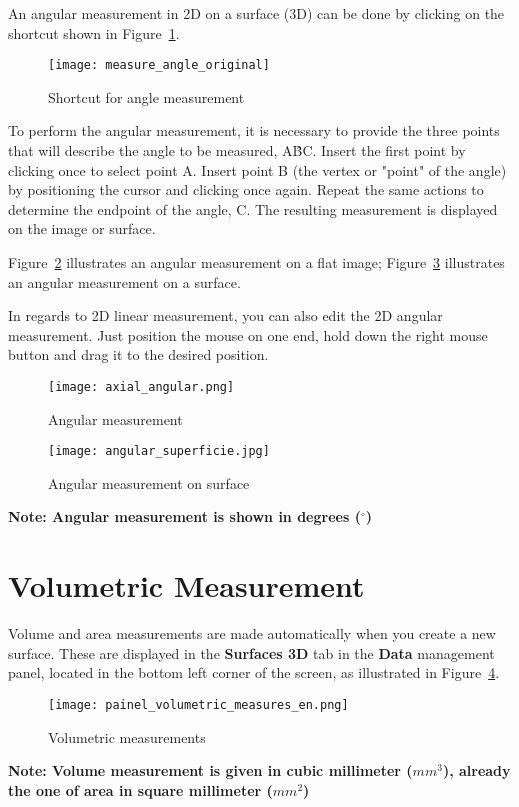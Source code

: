 An angular measurement in 2D on a surface (3D) can be done by clicking on the shortcut shown in Figure~\ref{fig:atalho_angular}.

\begin{figure}[!htb]
\centering
\texttt{[image: measure\_angle\_original]}
\caption{Shortcut for angle measurement}
\label{fig:atalho_angular}
\end{figure}

To perform the angular measurement, it is necessary to provide the three points that will describe the angle to be measured, A\^{B}C. Insert the first point by clicking once to select point A. Insert point B (the vertex or "point" of the angle) by positioning the cursor and clicking once again. Repeat the same actions to determine the endpoint of the angle, C. The resulting measurement is displayed on the image or surface.

Figure~\ref{fig:axial_angular} illustrates an angular measurement on a flat image; Figure~\ref{fig:axial_superficie} illustrates an angular measurement on a surface.

In regards to 2D linear measurement, you can also edit the 2D angular measurement. Just position the mouse on one end, hold down the right mouse button and drag it to the desired position.

\begin{figure}[!htb]
\centering
\texttt{[image: axial\_angular.png]}
\caption{Angular measurement}
\label{fig:axial_angular}
\end{figure}

\begin{figure}[!htb]
\centering
\texttt{[image: angular\_superficie.jpg]}
\caption{Angular measurement on surface}
\label{fig:axial_superficie}
\end{figure}

\textbf{Note: Angular measurement is shown in degrees ($^{\circ}$)}


\section{Volumetric Measurement}

Volume and area measurements are made automatically when you create a new surface. These are displayed in the \textbf{Surfaces 3D} tab in the \textbf{Data} management panel, located in the bottom left corner of the screen, as illustrated in Figure~\ref{fig:volumetric_mensure}.

\begin{figure}[!htb]
\centering
\texttt{[image: painel\_volumetric\_measures\_en.png]}
\caption{Volumetric measurements}
\label{fig:volumetric_mensure}
\end{figure}

\textbf{Note: Volume measurement is given in cubic millimeter ($mm^3$), already the one of area in square millimeter ($mm^2$)}